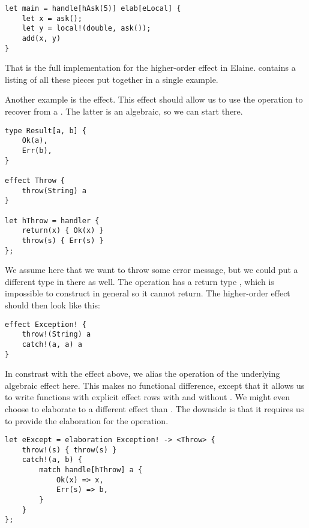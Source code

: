 \begin{lstlisting}[language=elaine,style=fancy]
let main = handle[hAsk(5)] elab[eLocal] {
    let x = ask();
    let y = local!(double, ask());
    add(x, y)
}
\end{lstlisting}

That is the full implementation for the higher-order  effect in Elaine.  contains a listing of all these pieces put together in a single example.

Another example is the  effect. This effect should allow us to use the  operation to recover from a . The latter is an algebraic, so we can start there.

\begin{lstlisting}[language=elaine,style=fancy]
type Result[a, b] {
    Ok(a),
    Err(b),
}

effect Throw {
    throw(String) a
}

let hThrow = handler {
    return(x) { Ok(x) }
    throw(s) { Err(s) }
};
\end{lstlisting}

We assume here that we want to throw some error message, but we could put a different type in there as well. The  operation has a return type , which is impossible to construct in general so it cannot return. The higher-order  effect should then look like this:

\begin{lstlisting}[language=elaine,style=fancy]
effect Exception! {
    throw!(String) a
    catch!(a, a) a
}
\end{lstlisting}

In constrast with the  effect above, we alias the operation of the underlying algebraic effect here. This makes no functional difference, except that it allows us to write functions with explicit effect rows with  and without . We might even choose to elaborate to a different effect than . The downside is that it requires us to provide the elaboration for the  operation.

\begin{lstlisting}[language=elaine,style=fancy]
let eExcept = elaboration Exception! -> <Throw> {
    throw!(s) { throw(s) }
    catch!(a, b) {
        match handle[hThrow] a {
            Ok(x) => x,
            Err(s) => b,
        }
    }
};
\end{lstlisting}


